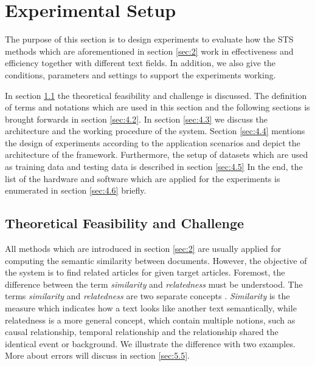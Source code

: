 \section{Experimental Setup}
\label{sec:4}

The purpose of this section is to design experiments to evaluate how the STS methods which are aforementioned in section \ref{sec:2} work in effectiveness and efficiency together with different text fields. In addition, we also give the conditions, parameters and settings to support the experiments working. 

In section \ref{sec:4.1} the theoretical feasibility and challenge is discussed. The definition of terms and notations which are used in this section and the following sections is brought forwards in section \ref{sec:4.2}. In section \ref{sec:4.3} we discuss the architecture and the working procedure of the system. Section \ref{sec:4.4} mentions the design of experiments according to the application scenarios and depict the architecture of the framework. Furthermore, the setup of datasets which are used as training data and testing data is described in section \ref{sec:4.5} In the end, the list of the hardware and software which are applied for the experiments is enumerated in section \ref{sec:4.6} briefly.

\bigbreak

\subsection{Theoretical Feasibility and Challenge}
\label{sec:4.1}

All methods which are introduced in section \ref{sec:2} are usually applied for computing the semantic similarity between documents. However, the objective of the system is to find related articles for given target articles. Foremost, the difference between the term \textit{similarity} and \textit{relatedness} must be understood. The terms \textit{similarity} and \textit{relatedness} are two separate concepts \cite{pedersen2007measures}. \textit{Similarity} is the measure which indicates how a text looks like another text semantically, while relatedness is a more general concept, which contain multiple notions, such as causal relationship, temporal relationship and the relationship shared the identical event or background. We illustrate the difference with two examples. More about errors will discuss in section \ref{sec:5.5}. 

